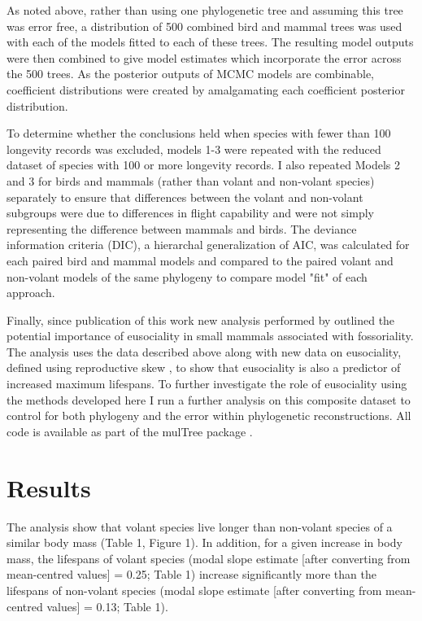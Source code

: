 As noted above, rather than using one phylogenetic tree and assuming this tree was error free, a distribution of 500 combined bird and mammal trees was used with each of the models fitted to each of these trees. The resulting model outputs were then combined to give model estimates which incorporate the error across the 500 trees. As the posterior outputs of MCMC models are combinable, coefficient distributions were created by amalgamating each coefficient posterior distribution. 

To determine whether the conclusions held when species with fewer than 100 longevity records was excluded, models 1-3 were repeated with the reduced dataset of species with 100 or more longevity records. I also repeated Models 2 and 3 for birds and mammals (rather than volant and non-volant species) separately to ensure that differences between the volant and non-volant subgroups were due to differences in flight capability and were not simply representing the difference between mammals and birds. The deviance information criteria (DIC), a hierarchal generalization of AIC, was calculated for each paired bird and mammal models and compared to the paired volant and non-volant models of the same phylogeny to compare model "fit" of each approach.

Finally, since publication of this work \citep{healy2014ecology} new analysis performed by \cite{williams2015ecology} outlined the potential importance of eusociality in small mammals associated with fossoriality. The analysis uses the data described above along with new data on eusociality, defined using reproductive skew \citep{williams2015ecology}, to show that eusociality is also a predictor of increased maximum lifespans. To further investigate the role of eusociality using the methods developed here I run a further analysis on this composite dataset to control for both phylogeny and the error within phylogenetic reconstructions. All code is available as part of the mulTree package \citep{MulTree}.

\section{Results}

The analysis show that volant species live longer than non-volant species of a similar body mass (Table 1, Figure 1). In addition, for a given increase in body mass, the lifespans of volant species (modal slope estimate [after converting from mean-centred values] = 0.25; Table 1) increase significantly more than the lifespans of non-volant species (modal slope estimate [after converting from mean-centred values] = 0.13; Table 1).

